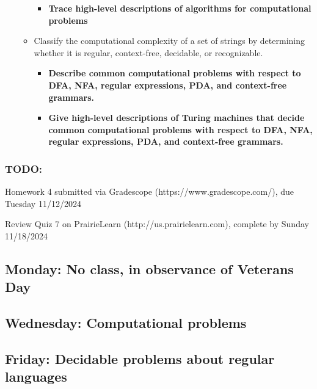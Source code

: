 \begin{itemize}
\begin{itemize}
\begin{itemize}
        \item {\bf Trace high-level descriptions of algorithms for computational problems}
        \end{itemize}
    \item Classify the computational complexity of a set of strings by determining whether it is regular, context-free, decidable, or recognizable.
    \begin{itemize}
    \item {\bf Describe common computational problems with respect to DFA, NFA, regular expressions, PDA, and context-free grammars.}
    \item {\bf Give high-level descriptions of Turing machines that decide common computational problems with respect to DFA, NFA, regular expressions, PDA, and context-free grammars.}
\end{itemize}
\end{itemize}
\end{itemize}

\vspace{-20pt}

\subsubsection*{TODO:}
\begin{list}{\itemsep-10pt}
   \item Homework 4 submitted via Gradescope (https://www.gradescope.com/), due Tuesday 11/12/2024
   \item Review Quiz 7 on PrairieLearn (http://us.prairielearn.com), complete by Sunday 11/18/2024
\end{list}

\newpage

\subsection*{Monday: No class, in observance of Veterans Day}
\subsection*{Wednesday: Computational problems}





\newpage
\subsection*{Friday: Decidable problems about regular languages}

